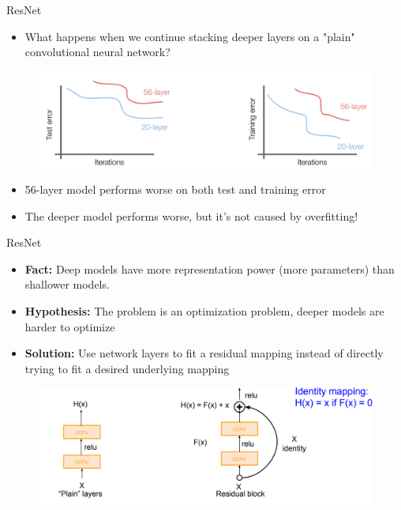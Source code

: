 \begin{frame}{ResNet}
    \begin{itemize}
        \item What happens when we continue stacking deeper layers on a "plain" convolutional neural network?
    \end{itemize}
\pause
    \begin{figure}
        \centering
        \includegraphics[width=1.0\textwidth,height=0.5\textheight,keepaspectratio]{images/cnn/resnet_2.png}
    \end{figure}

\pause
    \begin{itemize}
        \item 56-layer model performs worse on both test and training error
        \pause
        \item The deeper model performs worse, but it’s not caused by overfitting!
    \end{itemize}
\end{frame}


\begin{frame}{ResNet}
    \begin{itemize}
        \item \textbf{Fact:} Deep models have more representation power (more parameters) than shallower models.
        \pause
        \item \textbf{Hypothesis:} The problem is an optimization problem, deeper models are harder to optimize
        \pause
        \item \textbf{Solution:} Use network layers to fit a residual mapping instead of directly trying to fit a desired underlying mapping
    \end{itemize}
\pause
    \begin{figure}
        \centering
        \includegraphics[width=1.0\textwidth,height=0.5\textheight,keepaspectratio]{images/cnn/resnet_3.png}
    \end{figure}
\end{frame}